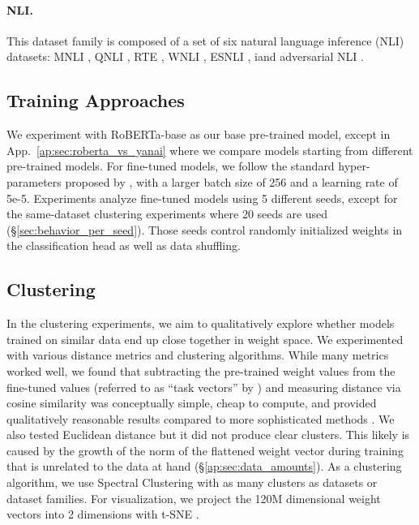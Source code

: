 \documentclass[nohyperref]{article}
\theoremstyle{plain}
\theoremstyle{definition}
\theoremstyle{remark}
\begin{document}
\paragraph{NLI.} This dataset family is composed of a set of six natural language inference (NLI) datasets: MNLI \citep{williams-etal-2018-broad}, QNLI \citealt{rajpurkar-etal-2016-squad}, RTE \citep{Dagan2005ThePR,BarHaim2006TheSP,Giampiccolo2007TheTP,Bentivogli2009TheSP}, WNLI \citep{Levesque2011TheWS}, ESNLI \citep{Camburu2018eSNLINL}, iand adversarial NLI \citep{nie-etal-2020-adversarial}.
%

\subsection{Training Approaches}\label{sec:settings} 

We experiment with RoBERTa-base \citep{Liu2019RoBERTaAR} as our base pre-trained model, except in App.~\ref{ap:sec:roberta_vs_yanai} where we compare models starting from different pre-trained models.
For fine-tuned models, %
we follow the standard hyper-parameters proposed by \citet{Liu2019RoBERTaAR}, with a larger batch size of 256 and a learning rate of 5e-5. Experiments analyze fine-tuned models using 5 different seeds, except for the same-dataset clustering experiments where 20 seeds are used (\S\ref{sec:behavior_per_seed}). Those seeds control randomly initialized weights in the classification head as well as data shuffling.


\subsection{Clustering}\label{sec:Clustering} 
In the clustering experiments, we aim to qualitatively explore whether models trained on similar data end up close together in weight space.
We experimented with various distance metrics and clustering algorithms.
While many metrics worked well, we found that subtracting the pre-trained weight values from the fine-tuned values (referred to as ``task vectors'' by \citet{ilharco2022editing}) and measuring distance via cosine similarity was conceptually simple, cheap to compute, and provided qualitatively reasonable results compared to more sophisticated methods \citep{kornblith2019similarity,toledo2022revisiting}.
We also tested Euclidean distance but it did not produce clear clusters. This likely is caused by the growth of the norm of the flattened weight vector during training \citep{merrill2020parameter} that is unrelated to the data at hand (\S\ref{ap:sec:data_amounts}).
As a clustering algorithm, we use Spectral Clustering with as many clusters as datasets or dataset families.
For visualization, we project the 120M dimensional weight vectors into 2 dimensions with t-SNE \citep{van2008visualizing}. 
\end{document}
